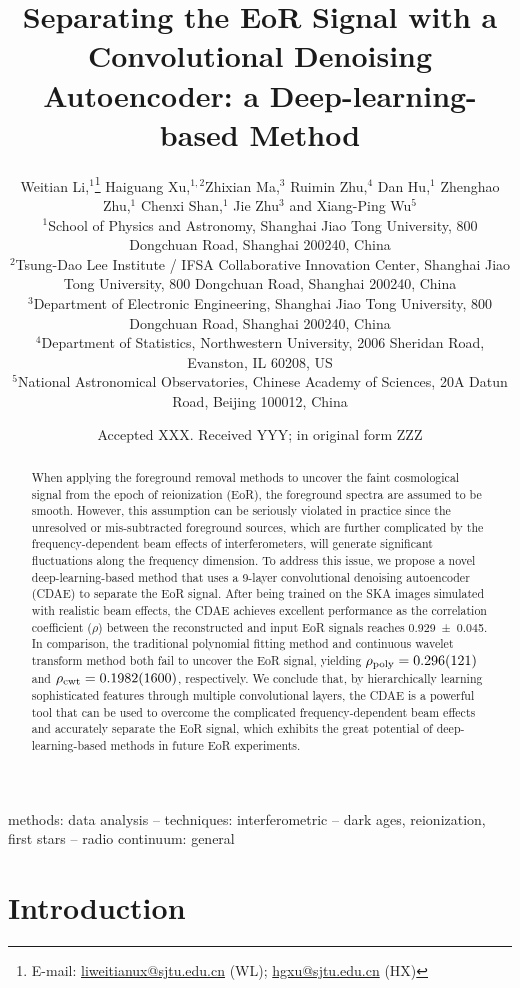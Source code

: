 \documentclass[fleqn,usenatbib]{mnras}
\title[EoR Signal Separation with a CDAE]{%
  Separating the EoR Signal with a Convolutional Denoising Autoencoder:
  a Deep-learning-based Method
}
\author[Li~et~al.]{%
Weitian Li,$^{1}$\thanks{E-mail:
  \href{mailto:liweitianux@sjtu.edu.cn}{liweitianux@sjtu.edu.cn} (WL);
  \href{mailto:hgxu@sjtu.edu.cn}{hgxu@sjtu.edu.cn} (HX)}
Haiguang Xu,$^{1,2}$\footnotemark[1]
Zhixian Ma,$^{3}$
Ruimin Zhu,$^{4}$
Dan Hu,$^{1}$
Zhenghao Zhu,$^{1}$
\newauthor  %
Chenxi Shan,$^{1}$
Jie Zhu$^{3}$
and
Xiang-Ping Wu$^{5}$
\\
$^{1}${School of Physics and Astronomy,
  Shanghai Jiao Tong University,
  800 Dongchuan Road, Shanghai 200240, China} \\
$^{2}${Tsung-Dao Lee Institute / IFSA Collaborative Innovation Center,
  Shanghai Jiao Tong University,
  800 Dongchuan Road, Shanghai 200240, China} \\
$^{3}${Department of Electronic Engineering,
  Shanghai Jiao Tong University,
  800 Dongchuan Road, Shanghai 200240, China} \\
$^{4}${Department of Statistics,
  Northwestern University,
  2006 Sheridan Road, Evanston, IL 60208, US} \\
$^{5}${National Astronomical Observatories,
  Chinese Academy of Sciences,
  20A Datun Road, Beijing 100012, China}
}
\date{Accepted XXX. Received YYY; in original form ZZZ}
\newcommand{\R}[1]{\mathrm{#1}}
\newcommand{\editwip}[1]{{\leavevmode\color{magenta}#1}}
\newcommand{\editone}[1]{{\leavevmode\color{cyan}#1}}
\begin{document}
\label{firstpage}
\pagerange{\pageref{firstpage}--\pageref{lastpage}}
\maketitle

%
%
\begin{abstract}
When applying the foreground removal methods to uncover the
\editone{faint cosmological signal from the epoch of reionization (EoR)},
the foreground spectra are assumed to be smooth.
However, this assumption can be seriously violated in practice since
the unresolved or mis-subtracted foreground sources, which are further
complicated by the frequency-dependent beam effects of interferometers,
will generate significant fluctuations along the frequency dimension.
To address this issue, we propose a novel deep-learning-based method
that uses a 9-layer convolutional denoising autoencoder (CDAE) to
separate the EoR signal.
After being trained on the SKA images simulated with realistic beam
effects, the CDAE achieves excellent performance as the correlation
coefficient ($\rho$) between the reconstructed and input EoR signals
reaches \editwip{\num{0.929 +- 0.045}}.
In comparison, \editwip{the traditional polynomial fitting method and
continuous wavelet transform method both fail to uncover the EoR signal,
yielding $\rho_{\R{poly}} = \num{0.296 +- 0.121}$ and
$\rho_{\R{cwt}} = \num{0.1982+- 0.160}$, respectively.} %
We conclude that, by hierarchically learning sophisticated features
through multiple convolutional layers, the CDAE is a powerful tool that
can be used to overcome the complicated frequency-dependent beam effects
and accurately separate the EoR signal, which exhibits the great
potential of deep-learning-based methods in future EoR experiments.
\end{abstract}

\begin{keywords}
methods: data analysis --
techniques: interferometric --
dark ages, reionization, first stars --
radio continuum: general
\end{keywords}



\section{Introduction}
\label{sec:intro}
\end{document}
